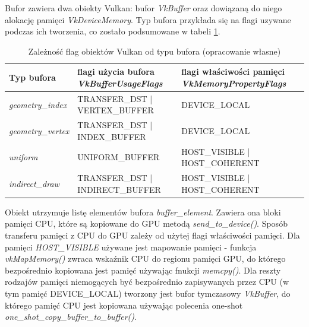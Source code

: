 Bufor zawiera dwa obiekty Vulkan: bufor \textit{VkBuffer} oraz dowiązaną do niego alokację pamięci \textit{VkDeviceMemory}.
Typ bufora przykłada się na flagi uzywane podczas ich tworzenia, co zostało podsumowane w tabeli \ref{params_buffer}.
\begin{table}[!htr]
	\centering
	\begin{tabular}{ |p{3cm}||>{\RaggedRight}p{4cm}|>{\RaggedRight}p{4cm}|}
		\hline
		Typ bufora & flagi użycia bufora \mbox{\textit{VkBufferUsageFlags}} & flagi właściwości pamięci \textit{VkMemoryPropertyFlags} \\
		\hline \hline
		\textit{geometry\_index} & \mbox{TRANSFER\_DST} | \mbox{VERTEX\_BUFFER} & DEVICE\_LOCAL \\
		\hline 
		\textit{geometry\_vertex} & \mbox{TRANSFER\_DST} | \mbox{INDEX\_BUFFER} & DEVICE\_LOCAL \\
		\hline 
		\textit{uniform} & \mbox{UNIFORM\_BUFFER} &  \mbox{HOST\_VISIBLE} | \mbox{HOST\_COHERENT} \\
		\hline 
		\textit{indirect\_draw} & \mbox{TRANSFER\_DST} | \mbox{INDIRECT\_BUFFER} &  \mbox{HOST\_VISIBLE} | \mbox{HOST\_COHERENT}\\
		\hline
	\end{tabular}
	\caption{Zależność flag obiektów Vulkan od typu bufora (opracowanie własne)} 
	\label{params_buffer}
\end{table}

Obiekt utrzymuje listę elementów bufora \textit{buffer\_element}. Zawiera ona bloki pamięci CPU, które są kopiowane do GPU metodą \textit{send\_to\_device()}.
Sposób transferu pamięci z CPU do GPU zależy od użytej flagi właściwości pamięci.
Dla pamięci \textit{HOST\_VISIBLE} używane jest mapowanie pamięci - funkcja \textit{vkMapMemory()} zwraca wskaźnik CPU do regionu pamięci GPU, do którego bezpośrednio kopiowana jest pamięć używając fnukcji \textit{memcpy()}.
Dla reszty rodzajów pamięci niemogących być bezpośrednio zapisywanych przez CPU (w tym pamięć DEVICE\_LOCAL) tworzony jest bufor tymczasowy \textit{VkBuffer}, do którego pamięć CPU jest kopiowana używając polecenia one-shot \textit{one\_shot\_copy\_buffer\_to\_buffer()}.


